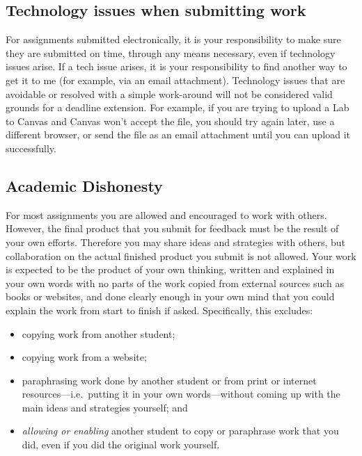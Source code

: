 \hypertarget{technology-issues-when-submitting-work}{%
\subsection{Technology issues when submitting
work}\label{technology-issues-when-submitting-work}}

For assignments submitted electronically, it is your responsibility to
make sure they are submitted on time, through any means necessary, even
if technology issues arise. If a tech issue arises, it is your
responsibility to find another way to get it to me (for example, via an
email attachment). Technology issues that are avoidable or resolved with
a simple work-around will not be considered valid grounds for a deadline
extension. For example, if you are trying to upload a Lab to Canvas and
Canvas won't accept the file, you should try again later, use a
different browser, or send the file as an email attachment until you can
upload it successfully.

\hypertarget{academic-dishonesty}{%
\subsection{Academic Dishonesty}\label{academic-dishonesty}}

For most assignments you are allowed and encouraged to work with others.
However, the final product that you submit for feedback must be the
result of your own efforts. Therefore you may share ideas and strategies
with others, but collaboration on the actual finished product you submit
is not allowed. Your work is expected to be the product of your own
thinking, written and explained in your own words with no parts of the
work copied from external sources such as books or websites, and done
clearly enough in your own mind that you could explain the work from
start to finish if asked. Specifically, this excludes:

\begin{itemize}
\tightlist
\item
  copying work from another student;
\item
  copying work from a website;
\item
  paraphrasing work done by another student or from print or internet
  resources---i.e.~putting it in your own words---without coming up with
  the main ideas and strategies yourself; and
\item
  \emph{allowing or enabling} another student to copy or paraphrase work
  that you did, even if you did the original work yourself.
\end{itemize}

